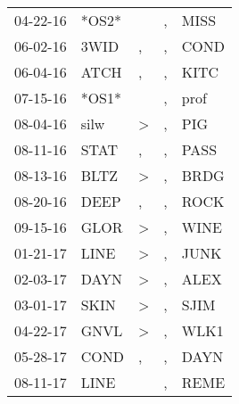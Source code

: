 \begin{supertabular}{p{0.07\textwidth}p{0.06\textwidth}p{0.02\textwidth}p{0.02\textwidth}p{0.06\textwidth}}
          04-22-16\textsuperscript{} &                            *OS2* &                  &             , &  MISS\textsuperscript{} \\
          06-02-16\textsuperscript{} &           3WID\textsuperscript{} &                , &             , &  COND\textsuperscript{} \\
          06-04-16\textsuperscript{} &           ATCH\textsuperscript{} &                , &             , &  KITC\textsuperscript{} \\
          07-15-16\textsuperscript{} &                            *OS1* &                  &             , &  prof\textsuperscript{} \\
          08-04-16\textsuperscript{} &           silw\textsuperscript{} &     \textgreater &             , &   PIG\textsuperscript{} \\
          08-11-16\textsuperscript{} &           STAT\textsuperscript{} &                , &             , &  PASS\textsuperscript{} \\
          08-13-16\textsuperscript{} &           BLTZ\textsuperscript{} &     \textgreater &             , &  BRDG\textsuperscript{} \\
          08-20-16\textsuperscript{} &           DEEP\textsuperscript{} &                , &             , &  ROCK\textsuperscript{} \\
          09-15-16\textsuperscript{} &           GLOR\textsuperscript{} &     \textgreater &             , &  WINE\textsuperscript{} \\
          01-21-17\textsuperscript{} &           LINE\textsuperscript{} &     \textgreater &             , &  JUNK\textsuperscript{} \\
          02-03-17\textsuperscript{} &           DAYN\textsuperscript{} &     \textgreater &             , &  ALEX\textsuperscript{} \\
          03-01-17\textsuperscript{} &           SKIN\textsuperscript{} &     \textgreater &             , &  SJIM\textsuperscript{} \\
          04-22-17\textsuperscript{} &           GNVL\textsuperscript{} &     \textgreater &             , &  WLK1\textsuperscript{} \\
          05-28-17\textsuperscript{} &           COND\textsuperscript{} &                , &             , &  DAYN\textsuperscript{} \\
          08-11-17\textsuperscript{} &           LINE\textsuperscript{} &                  &             , &  REME\textsuperscript{} \\

\end{supertabular}

